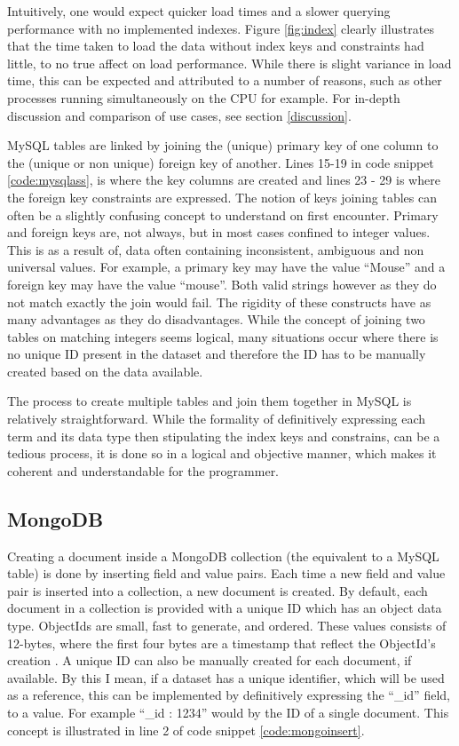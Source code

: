 Intuitively, one would expect quicker load times and a slower querying performance with no implemented indexes. Figure \ref{fig:index} clearly illustrates that the time taken to load the data without index keys and constraints had little, to no true affect on load performance. While there is slight variance in load time, this can be expected and attributed to a number of reasons, such as other processes running simultaneously on the CPU for example. For in-depth discussion and comparison of use cases, see section \ref{discussion}.

MySQL tables are linked by joining the (unique) primary key of one column to the (unique or non unique) foreign key of another. Lines 15-19 in code snippet \ref{code:mysqlass}, is where the key columns are created and lines 23 - 29 is where the foreign key constraints are expressed. The notion of keys joining tables can often be a slightly confusing concept to understand on first encounter. Primary and foreign keys are, not always, but in most cases confined to integer values. This is as a result of, data often containing inconsistent, ambiguous and non universal values. For example, a primary key may have the value ``Mouse'' and a foreign key may have the value ``mouse''. Both valid strings however as they do not match exactly the join would fail. The rigidity of these constructs have as many advantages as they do disadvantages. While the concept of joining two tables on matching integers seems logical, many situations occur where there is no unique ID present in the dataset and therefore the ID has to be manually created based on the data available.

The process to create multiple tables and join them together in MySQL is relatively straightforward. While the formality of definitively expressing each term and its data type then stipulating the index keys and constrains, can be a tedious process, it is done so in a logical and objective manner, which makes it coherent and understandable for the programmer.

\subsection*{MongoDB}
Creating a document inside a MongoDB collection (the equivalent to a MySQL table) is done by inserting field and value pairs. Each time a new field and value pair is inserted into a collection, a new document is created. By default, each document in a collection is provided with a unique ID which has an object data type. ObjectIds are small, fast to generate, and ordered. These values consists of 12-bytes, where the first four bytes are a timestamp that reflect the ObjectId’s creation \cite{mongo}. A unique ID can also be manually created for each document, if available. By this I mean, if a dataset has a unique identifier, which will be used as a reference, this can be implemented by definitively expressing the ``\_id'' field, to a value. For example ``\_id : 1234'' would by the ID of a single document. This concept is illustrated in line 2 of code snippet \ref{code:mongoinsert}.

